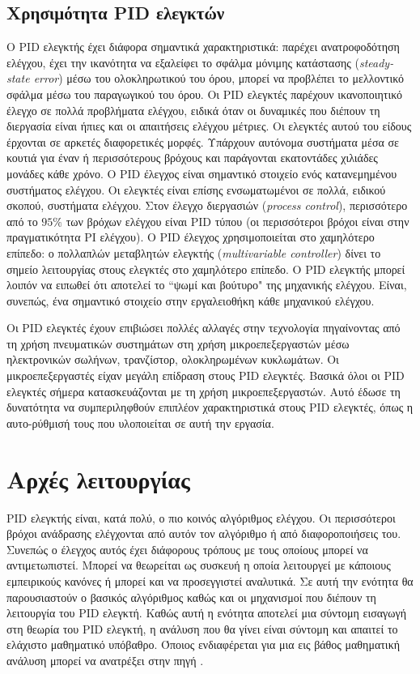 \subsection{Χρησιμότητα PID ελεγκτών}

Ο PID ελεγκτής έχει διάφορα σημαντικά χαρακτηριστικά: παρέχει ανατροφοδότηση ελέγχου, έχει την ικανότητα να εξαλείφει το σφάλμα μόνιμης κατάστασης (\emph{steady-state error}) μέσω του ολοκληρωτικού του όρου, μπορεί να προβλέπει το μελλοντικό σφάλμα μέσω του παραγωγικού του όρου. Οι PID ελεγκτές παρέχουν ικανοποιητικό έλεγχο σε πολλά προβλήματα ελέγχου, ειδικά όταν οι δυναμικές που διέπουν τη διεργασία είναι ήπιες και οι απαιτήσεις ελέγχου μέτριες. Οι ελεγκτές αυτού του είδους έρχονται σε αρκετές διαφορετικές μορφές. Υπάρχουν αυτόνομα συστήματα μέσα σε κουτιά για έναν ή περισσότερους βρόχους και παράγονται εκατοντάδες χιλιάδες μονάδες κάθε χρόνο. Ο PID έλεγχος είναι σημαντικό στοιχείο ενός κατανεμημένου συστήματος ελέγχου. Οι ελεγκτές είναι επίσης ενσωματωμένοι σε πολλά, ειδικού σκοπού, συστήματα ελέγχου. Στον έλεγχο διεργασιών (\emph{process control}), περισσότερο από το $95\%$ των βρόχων ελέγχου είναι PID τύπου (οι περισσότεροι βρόχοι είναι στην πραγματικότητα PI ελέγχου). Ο PID έλεγχος χρησιμοποιείται στο χαμηλότερο επίπεδο: ο πολλαπλών μεταβλητών ελεγκτής (\emph{multivariable controller}) δίνει το σημείο λειτουργίας στους ελεγκτές στο χαμηλότερο επίπεδο. Ο PID ελεγκτής μπορεί λοιπόν να ειπωθεί ότι αποτελεί το ``ψωμί και βούτυρο" της μηχανικής ελέγχου. Είναι, συνεπώς, ένα σημαντικό στοιχείο στην εργαλειοθήκη κάθε μηχανικού ελέγχου. 

Οι PID ελεγκτές έχουν επιβιώσει πολλές αλλαγές στην τεχνολογία πηγαίνοντας από τη χρήση πνευματικών συστημάτων στη χρήση μικροεπεξεργαστών μέσω ηλεκτρονικών σωλήνων, τρανζίστορ, ολοκληρωμένων κυκλωμάτων. Οι μικροεπεξεργαστές είχαν μεγάλη επίδραση στους PID ελεγκτές. Βασικά όλοι οι PID ελεγκτές σήμερα κατασκευάζονται με τη χρήση μικροεπεξεργαστών. Αυτό έδωσε τη δυνατότητα να συμπεριληφθούν επιπλέον χαρακτηριστικά στους PID ελεγκτές, όπως η αυτο-ρύθμισή τους που υλοποιείται σε αυτή την εργασία.

\section{Αρχές λειτουργίας}

\lettrine[findent=2pt]{}{} PID ελεγκτής είναι, κατά πολύ, ο πιο κοινός αλγόριθμος ελέγχου. Οι περισσότεροι βρόχοι ανάδρασης ελέγχονται από αυτόν τον αλγόριθμο ή από διαφοροποιήσεις του. Συνεπώς ο έλεγχος αυτός έχει διάφορους τρόπους με τους οποίους μπορεί να αντιμετωπιστεί. Μπορεί να θεωρείται ως συσκευή η οποία λειτουργεί με κάποιους εμπειρικούς κανόνες ή μπορεί και να προσεγγιστεί αναλυτικά. Σε αυτή την ενότητα θα παρουσιαστούν ο βασικός αλγόριθμος καθώς και οι μηχανισμοί που διέπουν τη λειτουργία του PID ελεγκτή. Καθώς αυτή η ενότητα αποτελεί μια σύντομη εισαγωγή στη θεωρία του PID ελεγκτή, η ανάλυση που θα γίνει είναι σύντομη και απαιτεί το ελάχιστο μαθηματικό υπόβαθρο. Όποιος ενδιαφέρεται για μια εις βάθος μαθηματική ανάλυση μπορεί να ανατρέξει στην πηγή \cite{astrom}.

